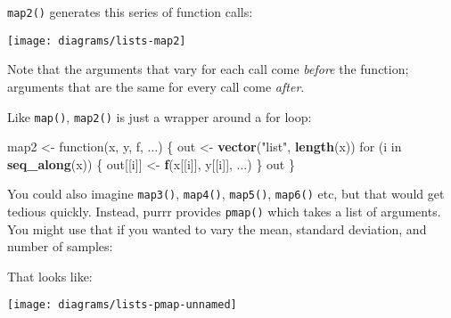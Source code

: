 \documentclass[]{book}
\newenvironment{Shaded}{\begin{snugshade}}{\end{snugshade}}
\newcommand{\KeywordTok}[1]{\textcolor[rgb]{0.13,0.29,0.53}{\textbf{{#1}}}}
\newcommand{\DecValTok}[1]{\textcolor[rgb]{0.00,0.00,0.81}{{#1}}}
\newcommand{\StringTok}[1]{\textcolor[rgb]{0.31,0.60,0.02}{{#1}}}
\newcommand{\CommentTok}[1]{\textcolor[rgb]{0.56,0.35,0.01}{\textit{{#1}}}}
\newcommand{\NormalTok}[1]{{#1}}
\begin{document}
\texttt{map2()} generates this series of function calls:

\begin{center}\texttt{[image: diagrams/lists-map2]} \end{center}

Note that the arguments that vary for each call come \emph{before} the
function; arguments that are the same for every call come \emph{after}.

Like \texttt{map()}, \texttt{map2()} is just a wrapper around a for
loop:

\begin{Shaded}
\begin{Highlighting}[]
\NormalTok{map2 <-}\StringTok{ }\NormalTok{function(x, y, f, ...) \{}
  \NormalTok{out <-}\StringTok{ }\KeywordTok{vector}\NormalTok{(}\StringTok{"list"}\NormalTok{, }\KeywordTok{length}\NormalTok{(x))}
  \NormalTok{for (i in }\KeywordTok{seq_along}\NormalTok{(x)) \{}
    \NormalTok{out[[i]] <-}\StringTok{ }\KeywordTok{f}\NormalTok{(x[[i]], y[[i]], ...)}
  \NormalTok{\}}
  \NormalTok{out}
\NormalTok{\}}
\end{Highlighting}
\end{Shaded}

You could also imagine \texttt{map3()}, \texttt{map4()},
\texttt{map5()}, \texttt{map6()} etc, but that would get tedious
quickly. Instead, purrr provides \texttt{pmap()} which takes a list of
arguments. You might use that if you wanted to vary the mean, standard
deviation, and number of samples:

\begin{Shaded}
\end{Shaded}

That looks like:

\begin{center}\texttt{[image: diagrams/lists-pmap-unnamed]} \end{center}
\end{document}
